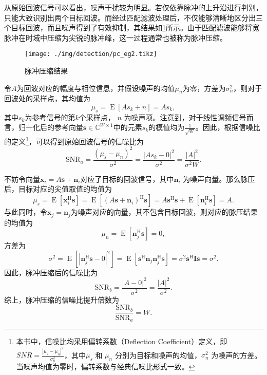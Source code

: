 \begin{solution}
    从原始回波信号可以看出，噪声干扰较为明显。若仅依靠脉冲的上升沿进行判别，只能大致识别出两个目标回波。而经过匹配滤波处理后，不仅能够清晰地区分出三个目标回波，而且噪声得到了有效抑制，其结果如\cref{fig_pc_eg2}所示。由于匹配滤波能够将宽脉冲在时域中压缩为尖锐的脉冲峰，这一过程通常也被称为脉冲压缩。
    \begin{figure}[htb!]
        \centering
        \texttt{[image: ./img/detection/pc\_eg2.tikz]}
        \caption{脉冲压缩结果}
        \label{fig_pc_eg2}
    \end{figure}

    令\( A \)为回波对应的幅度与相位信息，并假设噪声的均值\( \mu_n \)为零，方差为\( \sigma_n^2 \)，则对于回波处的采样点，其均值为
    \[
        \mu_s = \operatorname{E}[A s_k + n] = A s_k,
    \]
    其中\( s_k \)为参考信号的第\( k \)个采样点， \( n \) 为噪声项。注意到，对于线性调频信号而言，归一化后的参考向量\( \bm{s} \in \mathbb{C}^{W \times 1} \)中的元素\( s_k \)的模值均为\( \frac{1}{\sqrt{W}} \)。因此，根据信噪比的定义\footnote{本书中，信噪比均采用偏转系数（Deflection Coefficient）定义，即\( SNR = \frac{|\mu_s - \mu_n|^2}{\sigma_n^2} \)，其中\( \mu_s \) 和 \( \mu_n \) 分别为目标和噪声的均值，\( \sigma_n^2 \) 为噪声的方差。当噪声均值为零时，偏转系数与经典信噪比形式一致。}，可以得到原始回波信号的信噪比为
    \[
        \mathrm{SNR}_{a} = \frac{(\mu_s - \mu_n)^2}{\sigma^2} = \frac{|A s_k - 0|^2}{\sigma^2} = \frac{|A|^2}{\sigma^2 W}.
    \]

    不妨令向量\( \bm{x}_i = A \bm{s} + \bm{n}_i \)对应了目标的回波信号，其中\(\bm{n}_i\) 为噪声向量。那么脉压后，目标对应的尖值取值的均值为
    \[
        \mu_s = \operatorname{E}[\bm{x}_i^{\mathrm{H}} \bm{s}] = \operatorname{E}[(A \bm{s} + \bm{n}_i)^{\mathrm{H}} \bm{s}] = A \bm{s}^{\mathrm{H}} \bm{s} + \operatorname{E}[\bm{n}_i^{\mathrm{H}} \bm{s}] = A.
    \]
    与此同时，令\( \bm{x}_j = \bm{n}_j \)为噪声对应的向量，其不包含目标回波，则对应的脉压结果的均值为
    \[
        \mu_n = \operatorname{E}[\bm{n}_j^{\mathrm{H}} \bm{s}] = 0,
    \]
    方差为
    \[
        \sigma^2 = \operatorname{E}[|\bm{n}_j^{\mathrm{H}} \bm{s} - 0|^2] = \operatorname{E}[\bm{s}^{\mathrm{H}} \bm{n}_j \bm{n}_j^{\mathrm{H}} \bm{s}] = \sigma^2 \bm{s}^{\mathrm{H}} \mathbf{I} \bm{s} = \sigma^2.
    \]
    因此，脉冲压缩后的信噪比为
    \[
        \mathrm{SNR}_{b} = \frac{|A-0|^2}{\sigma^2} = \frac{|A|^2}{\sigma^2}.
    \]
    综上，脉冲压缩的信噪比提升倍数为
    \[
        \frac{\mathrm{SNR}_{b}}{\mathrm{SNR}_{a}} = W.
    \]
\end{solution}

